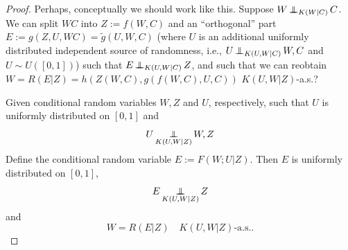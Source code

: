 \begin{proof}
  Perhaps, conceptually we should work like this. Suppose $W \operatorname*{\perp\mkern-11mu\perp}_{K(W|C)} C$. 
  We can split $WC$ into $Z:=f(W,C)$ and
  an ``orthogonal'' part $E:=g(Z,U,WC)=\tilde{g}(U,W,C)$ (where $U$ is an additional uniformly distributed independent source of randomness, i.e., $U \operatorname*{\perp\mkern-11mu\perp}_{K(U,W|C)} W,C$ and $U \sim U([0,1])$)
  such that $E \operatorname*{\perp\mkern-11mu\perp}_{K(U,W|C)} Z$, and such that we can reobtain $W = R(E|Z) = h(Z(W,C),g(f(W,C),U,C))$
  $K(U,W|Z)$-a.s.?

  Given conditional random variables $W,Z$ and $U$, respectively, such that $U$ is uniformly distributed on $[0,1]$ and 
\[ U \operatorname*{\perp\mkern-11mu\perp}_{K(U,W|Z)} W,Z \]
Define the conditional random variable $E := F(W;U|Z)$. Then $E$ is uniformly distributed on $[0,1]$,
\[ E \operatorname*{\perp\mkern-11mu\perp}_{K(U,W|Z)} Z \]
and 
\[ W = R(E|Z) \quad K(U,W|Z)\text{-a.s.}.\]
\end{proof}

